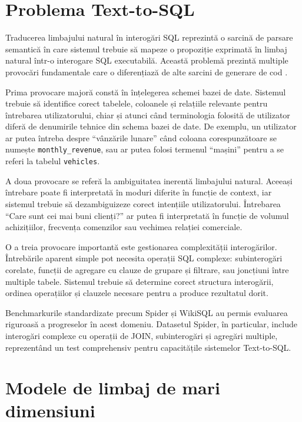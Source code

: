 \documentclass[12pt, a4paper]{report}
\newcommand{\code}[1]{\texttt{#1}}
\begin{document}
\section{Problema Text-to-SQL}

Traducerea limbajului natural în interogări SQL reprezintă o sarcină de parsare semantică în care sistemul trebuie să mapeze o propoziție exprimată în limbaj natural într-o interogare SQL executabilă. Această problemă prezintă multiple provocări fundamentale care o diferențiază de alte sarcini de generare de cod \cite{seq2sql}.

Prima provocare majoră constă în înțelegerea schemei bazei de date. Sistemul trebuie să identifice corect tabelele, coloanele și relațiile relevante pentru întrebarea utilizatorului, chiar și atunci când terminologia folosită de utilizator diferă de denumirile tehnice din schema bazei de date. De exemplu, un utilizator ar putea întreba despre ``vânzările lunare'' când coloana corespunzătoare se numește \code{monthly\_revenue}, sau ar putea folosi termenul ``mașini'' pentru a se referi la tabelul \code{vehicles}.

A doua provocare se referă la ambiguitatea inerentă limbajului natural. Aceeași întrebare poate fi interpretată în moduri diferite în funcție de context, iar sistemul trebuie să dezambiguizeze corect intențiile utilizatorului. Întrebarea ``Care sunt cei mai buni clienți?'' ar putea fi interpretată în funcție de volumul achizițiilor, frecvența comenzilor sau vechimea relației comerciale.

O a treia provocare importantă este gestionarea complexității interogărilor. Întrebările aparent simple pot necesita operații SQL complexe: subinterogări corelate, funcții de agregare cu clauze de grupare și filtrare, sau joncțiuni între multiple tabele. Sistemul trebuie să determine corect structura interogării, ordinea operațiilor și clauzele necesare pentru a produce rezultatul dorit.

Benchmarkurile standardizate precum Spider \cite{spider} și WikiSQL \cite{seq2sql} au permis evaluarea riguroasă a progreselor în acest domeniu. Datasetul Spider, în particular, include interogări complexe cu operații de JOIN, subinterogări și agregări multiple, reprezentând un test comprehensiv pentru capacitățile sistemelor Text-to-SQL.

\section{Modele de limbaj de mari dimensiuni}
\end{document}
